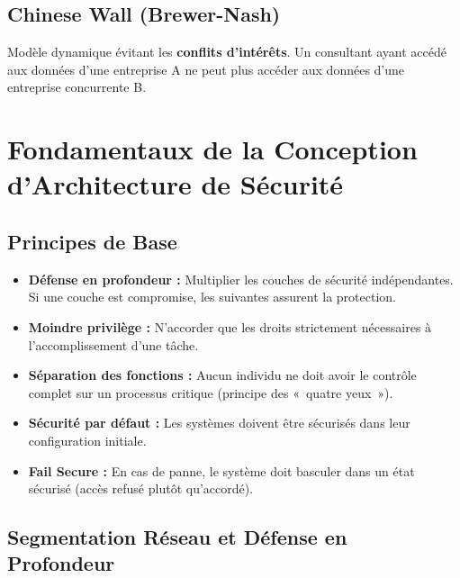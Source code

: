 \subsection{Chinese Wall (Brewer-Nash)}
Modèle dynamique évitant les \textbf{conflits d'intérêts}. Un consultant ayant accédé aux données d'une entreprise A ne peut plus accéder aux données d'une entreprise concurrente B.

\section{Fondamentaux de la Conception d'Architecture de Sécurité}

\subsection{Principes de Base}

\begin{itemize}
    \item \textbf{Défense en profondeur :} Multiplier les couches de sécurité indépendantes. Si une couche est compromise, les suivantes assurent la protection.
    \item \textbf{Moindre privilège :} N'accorder que les droits strictement nécessaires à l'accomplissement d'une tâche.
    \item \textbf{Séparation des fonctions :} Aucun individu ne doit avoir le contrôle complet sur un processus critique (principe des «~quatre yeux~»).
    \item \textbf{Sécurité par défaut :} Les systèmes doivent être sécurisés dans leur configuration initiale.
    \item \textbf{Fail Secure :} En cas de panne, le système doit basculer dans un état sécurisé (accès refusé plutôt qu'accordé).
\end{itemize}

\subsection{Segmentation Réseau et Défense en Profondeur}

